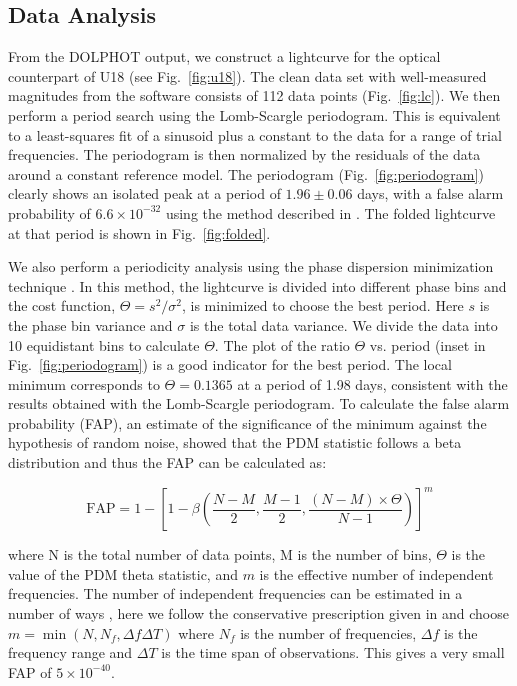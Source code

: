 \documentclass[fleqn,usenatbib,useAMS,letters]{mnras}
\begin{document}
 
 \subsection{Data Analysis}
 
From the DOLPHOT output, we construct a lightcurve for the optical counterpart of U18 (see Fig.~\ref{fig:u18}). The clean data set with well-measured magnitudes from the software consists of 112 data points (Fig.~\ref{fig:lc}). %
We then perform a period search using the Lomb-Scargle \citep{1976Ap&SS..39..447L,1982ApJ...263..835S} periodogram. This is equivalent to a least-squares fit of a sinusoid plus a constant to the data for a range of trial frequencies. The periodogram is then normalized by the residuals of the data around a constant reference model. The periodogram %
(Fig.~\ref{fig:periodogram}) clearly shows an isolated peak at a period of $1.96\pm 0.06$  days, with a false alarm probability of $6.6\times 10^{-32}$ using the method described in \cite{Baluev}. The folded lightcurve at that period is shown in Fig.~\ref{fig:folded}.


We also perform a periodicity analysis using the phase dispersion minimization technique  \citep[PDM][]{PDMStellingwerf78}. In this method, the lightcurve is divided into different phase bins and the cost function, $\Theta =s^2/\sigma^2$, is minimized to choose the best period. 
Here $s$ is the phase bin variance and $\sigma$ is the total data variance. We divide the data into 10 equidistant bins to calculate $\Theta$. The plot of the ratio $\Theta$ vs. period (inset in Fig.~\ref{fig:periodogram}) is a good indicator for the best  period. %
The local minimum corresponds to $\Theta = 0.1365$ at a period of 1.98 days, consistent with the results obtained with the Lomb-Scargle periodogram. To calculate the false alarm probability (FAP), an estimate of the significance of the minimum against the hypothesis of random noise, \cite{pdmbeta97} showed that the PDM statistic follows a beta distribution and thus the FAP can be calculated as:

$$\text{FAP} = 1-\left [ 1 - \beta\left ( \frac{N-M}{2},\frac{M-1}{2},\frac{(N-M)\times \Theta}{N-1}\right )\right ]^m$$

\noindent where N is the total number of data points, M is the number of bins, $\Theta$ is the value of the PDM theta statistic, and $m$ is the effective number of independent frequencies. The number of independent frequencies can be estimated in a number of ways \citep[e.g.,][]{Nemec1985,HorneLombFreq1986,Cumming2004}, here we follow the conservative prescription given in \cite{GuidePeriodSearch2003}  and choose $m= \min(N, N_f,\Delta f \Delta T)$ where $N_f$ is the number of frequencies, $\Delta f$ is the frequency range and $\Delta T$ is the time span of observations. This gives a very small FAP of  $5\times 10 ^{-40}$.
\end{document}
